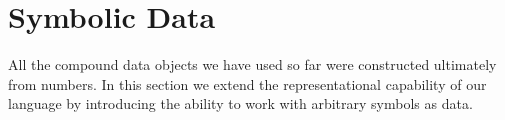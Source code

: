 \section{Symbolic Data}
\label{Section 2.3}

All the compound data objects we have used so far were constructed ultimately
from numbers.  In this section we extend the representational capability of our
language by introducing the ability to work with arbitrary symbols as data.



